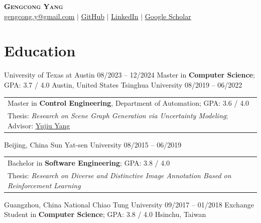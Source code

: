 

\begin{center}
    \textbf{\Huge \scshape Gengcong Yang} \\ \vspace{4pt}
    \href{mailto:gengcong.y@gmail.com}{\underline{gengcong.y@gmail.com}} $|$
    \href{https://github.com/gcyng}{\underline{GitHub}} $|$
    \href{https://www.linkedin.com/in/g-yang/}{\underline{LinkedIn}} $|$
    \href{https://scholar.google.com/citations?user=UJ2bDkkAAAAJ&hl=en#}{\underline{Google Scholar}}
\end{center}
\vspace{-22pt}

\section{Education}
  \resumeSubHeadingListStart
      \resumeSubheading
      {University of Texas at Austin}
      {08/2023 -- 12/2024}
      {Master in \textbf{Computer Science}; GPA: 3.7 / 4.0}
      {Austin, United States}
    \vspace{-12pt}
    \resumeSubheading
      {Tsinghua University}
      {08/2019 -- 06/2022}
      {\begin{tabular}[t]{@{}l@{}}Master in \textbf{Control Engineering}, Department of Automation; GPA: 3.6 / 4.0 \\ Thesis: \textit{Research on Scene Graph Generation via Uncertainty Modeling}; Advisor: \href{https://scholar.google.com/citations?user=4gH3sxsAAAAJ}{\underline{Yujiu Yang}}\end{tabular}}
      {Beijing, China}
    \vspace{-3pt}
    \resumeSubheading
      {Sun Yat-sen University}
      {08/2015 -- 06/2019}
      {\begin{tabular}[t]{@{}l@{}}Bachelor in \textbf{Software Engineering}; GPA: 3.8 / 4.0 \\ Thesis: \textit{Research on Diverse and Distinctive Image Annotation Based on Reinforcement Learning}\end{tabular}} {Guangzhou, China}
    \vspace{-3pt}
    \resumeSubheading
      {National Chiao Tung University}
      {09/2017 -- 01/2018}
      {Exchange Student in \textbf{Computer Science}; GPA: 3.8 / 4.0}
      {Hsinchu, Taiwan}
  \resumeSubHeadingListEnd

